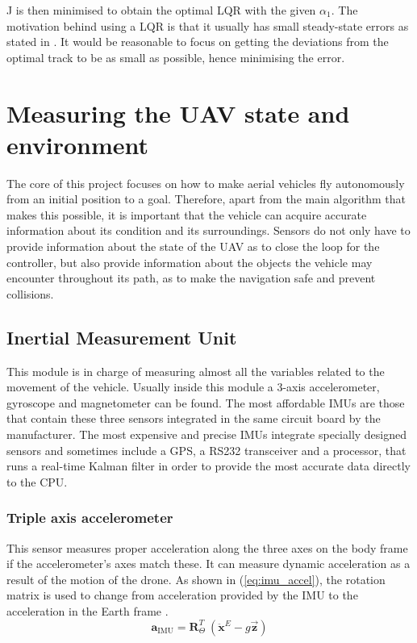 \documentclass[journal]{IEEEtran}
\newcommand*{\subb}[1]{_{\mathrm{#1}}}
\begin{document}
	 J is then minimised to obtain the optimal LQR with the given $\alpha_{1}$. The motivation behind using a LQR is that it usually has small steady-state errors as stated in \cite{lqr_error}. It would be reasonable to focus on getting the deviations from the optimal track to be as small as possible, hence minimising the error.   
	
	\section{Measuring the UAV state and environment}
	The core of this project focuses on how to make aerial vehicles fly autonomously from an initial position to a goal. Therefore, apart from the main algorithm that makes this possible, it is important that the vehicle can acquire accurate information about its condition and its surroundings. Sensors do not only have to provide information about the state of the UAV as to close the loop for the controller, but also provide information about the objects the vehicle may encounter throughout its path, as to make the navigation safe and prevent collisions.\\

		\subsection{Inertial Measurement Unit}
		This module is in charge of measuring almost all the variables related to the movement of the vehicle. Usually inside this module  a 3-axis accelerometer, gyroscope and magnetometer can be found. The most affordable IMUs are those that contain these three sensors integrated in the same circuit board by the manufacturer. The most expensive and precise IMUs integrate specially designed sensors and sometimes include a GPS, a RS232 transceiver and a processor, that runs a real-time Kalman filter in order to provide the most accurate data directly to the CPU. \\
		

		\subsubsection{Triple axis accelerometer} This sensor measures proper acceleration along the three axes on the body frame if the accelerometer's axes match these. It can measure dynamic acceleration as a result of the motion of the drone.  As shown in (\ref{eq:imu_accel}), the rotation matrix is used to change from acceleration provided by the IMU to the acceleration in the Earth frame \cite{modelling_control_mahony}.\\
		\begin{equation} \label{eq:imu_accel}
		\bm{a}\subb{IMU}= \bm{R}^T_\Theta \ (\bm{\ddot{x}}^E - g \bm{\vec{z}})
		\end{equation}
		
\end{document}
